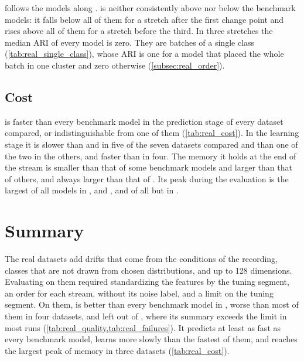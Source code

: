  follows the models along \InsectsAbrupt. \MicroTEDAClusPlus is neither consistently above nor below the benchmark models: it falls below all of them for a stretch after the first change point and rises above all of them for a stretch before the third. In three stretches the median ARI of every model is zero. They are batches of a single class (\cref{tab:real_single_class}), whose ARI is one for a model that placed the whole batch in one cluster and zero otherwise (\cref{subsec:real_order}).

\subsection{Cost}
\label{subsec:real_cost}



\MicroTEDAClusPlus is faster than every benchmark model in the prediction stage of every dataset compared, or indistinguishable from one of them (\cref{tab:real_cost}). In the learning stage it is slower than \MiniBatchKMeans and \BICO in five of the seven datasets compared and than one of the two in the others, and faster than \DBSTREAM in four. The memory it holds at the end of the stream is smaller than that of some benchmark models and larger than that of others, and always larger than that of \MiniBatchKMeans. Its peak during the evaluation is the largest of all models in \InsectsAbrupt, \Pendigits and \Shuttle, and of all but \BIRCH in \InsectsReoccurring.

\section{Summary}
\label{sec:real_summary}

The real datasets add drifts that come from the conditions of the recording, classes that are not drawn from chosen distributions, and up to 128 dimensions. Evaluating on them required standardizing the features by the tuning segment, an order for each stream, \MicroTEDAClusPlus without its noise label, and a limit on the tuning segment. On them, \MicroTEDAClusPlus is better than every benchmark model in \Shuttle, worse than most of them in four datasets, and left out of \Covertype, where its summary exceeds the limit in most runs (\cref{tab:real_quality,tab:real_failures}). It predicts at least as fast as every benchmark model, learns more slowly than the fastest of them, and reaches the largest peak of memory in three datasets (\cref{tab:real_cost}).
